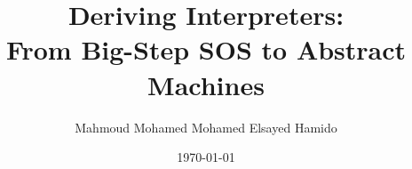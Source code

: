\title{Deriving Interpreters:\\ From Big-Step SOS to Abstract Machines}

    \author{Mahmoud Mohamed Mohamed Elsayed Hamido}

    \date{\today}

    \newcommand{\examinerA}{Prof. Dr. Ralf Hinze}
    \newcommand{\examinerB}{}

    \newcommand{\thesisType}{Master}